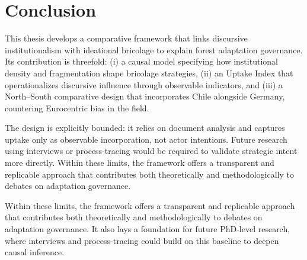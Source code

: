 
\section*{Conclusion}

This thesis develops a comparative framework that links discursive institutionalism 
with ideational bricolage to explain forest adaptation governance. Its contribution 
is threefold: (i) a causal model specifying how institutional density and fragmentation 
shape bricolage strategies, (ii) an Uptake Index that operationalizes discursive 
influence through observable indicators, and (iii) a North–South comparative design 
that incorporates Chile alongside Germany, countering Eurocentric bias in the field.

The design is explicitly bounded: it relies on document analysis and captures uptake 
only as observable incorporation, not actor intentions. Future research using 
interviews or process-tracing would be required to validate strategic intent more 
directly. Within these limits, the framework offers a transparent and replicable 
approach that contributes both theoretically and methodologically to debates on 
adaptation governance.

Within these limits, the framework offers a transparent and replicable approach that 
contributes both theoretically and methodologically to debates on adaptation governance. 
It also lays a foundation for future PhD-level research, where interviews and process-tracing 
could build on this baseline to deepen causal inference.


